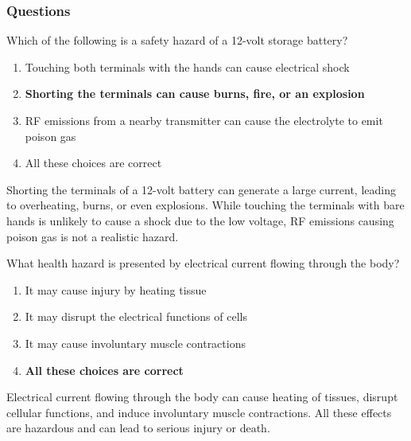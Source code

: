 \subsubsection*{Questions}
\begin{tcolorbox}[colback=gray!10!white,colframe=black!75!black,title={T0A01}]
    Which of the following is a safety hazard of a 12-volt storage battery?
    \begin{enumerate}[label=\Alph*),noitemsep]
        \item Touching both terminals with the hands can cause electrical shock
        \item \textbf{Shorting the terminals can cause burns, fire, or an explosion}
        \item RF emissions from a nearby transmitter can cause the electrolyte to emit poison gas
        \item All these choices are correct
    \end{enumerate}
\end{tcolorbox}
Shorting the terminals of a 12-volt battery can generate a large current, leading to overheating, burns, or even explosions. While touching the terminals with bare hands is unlikely to cause a shock due to the low voltage, RF emissions causing poison gas is not a realistic hazard.

\begin{tcolorbox}[colback=gray!10!white,colframe=black!75!black,title={T0A02}]
    What health hazard is presented by electrical current flowing through the body?
    \begin{enumerate}[label=\Alph*),noitemsep]
        \item It may cause injury by heating tissue
        \item It may disrupt the electrical functions of cells
        \item It may cause involuntary muscle contractions
        \item \textbf{All these choices are correct}
    \end{enumerate}
\end{tcolorbox}
Electrical current flowing through the body can cause heating of tissues, disrupt cellular functions, and induce involuntary muscle contractions. All these effects are hazardous and can lead to serious injury or death.

